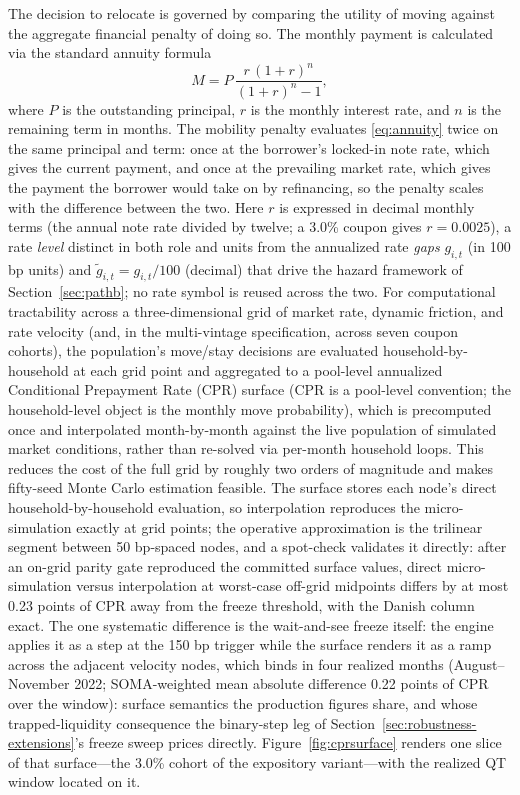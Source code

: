 \documentclass[12pt]{article}
\begin{document}
The decision to relocate is governed by comparing the utility of moving against the aggregate financial penalty of doing so. The monthly payment is calculated via the standard annuity formula
\begin{equation}\label{eq:annuity}
M = P\,\frac{r\,(1+r)^{n}}{(1+r)^{n}-1},
\end{equation}
where $P$ is the outstanding principal, $r$ is the monthly interest rate, and $n$ is the remaining term in months. The mobility penalty evaluates \eqref{eq:annuity} twice on the same principal and term: once at the borrower's locked-in note rate, which gives the current payment, and once at the prevailing market rate, which gives the payment the borrower would take on by refinancing, so the penalty scales with the difference between the two. Here $r$ is expressed in decimal monthly terms (the annual note rate divided by twelve; a 3.0\% coupon gives $r = 0.0025$), a rate \emph{level} distinct in both role and units from the annualized rate \emph{gaps} $g_{i,t}$ (in 100 bp units) and $\tilde g_{i,t} = g_{i,t}/100$ (decimal) that drive the hazard framework of Section~\ref{sec:pathb}; no rate symbol is reused across the two. For computational tractability across a three-dimensional grid of market rate, dynamic friction, and rate velocity (and, in the multi-vintage specification, across seven coupon cohorts), the population's move/stay decisions are evaluated household-by-household at each grid point and aggregated to a pool-level annualized Conditional Prepayment Rate (CPR) surface (CPR is a pool-level convention; the household-level object is the monthly move probability), which is precomputed once and interpolated month-by-month against the live population of simulated market conditions, rather than re-solved via per-month household loops. This reduces the cost of the full grid by roughly two orders of magnitude and makes fifty-seed Monte Carlo estimation feasible. The surface stores each node's direct household-by-household evaluation, so interpolation reproduces the micro-simulation exactly at grid points; the operative approximation is the trilinear segment between 50 bp-spaced nodes, and a spot-check validates it directly: after an on-grid parity gate reproduced the committed surface values, direct micro-simulation versus interpolation at worst-case off-grid midpoints differs by at most 0.23 points of CPR away from the freeze threshold, with the Danish column exact. The one systematic difference is the wait-and-see freeze itself: the engine applies it as a step at the 150 bp trigger while the surface renders it as a ramp across the adjacent velocity nodes, which binds in four realized months (August--November 2022; SOMA-weighted mean absolute difference 0.22 points of CPR over the window): surface semantics the production figures share, and whose trapped-liquidity consequence the binary-step leg of Section~\ref{sec:robustness-extensions}'s freeze sweep prices directly. Figure~\ref{fig:cprsurface} renders one slice of that surface---the 3.0\% cohort of the expository variant---with the realized QT window located on it.
\end{document}

